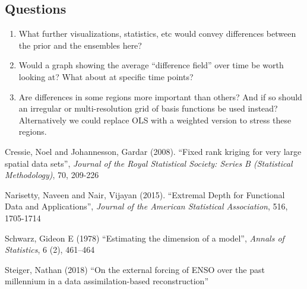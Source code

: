 \documentclass[12pt]{article}
\begin{document}
\subsection{Questions}
\begin{enumerate}
	\item What further visualizations, statistics, etc would convey differences between the prior and the ensembles here? 
	\item Would a graph showing the average ``difference field'' over time be worth looking at? What about at specific time points?
	\item Are differences in some regions more important than others? And if so should an irregular or multi-resolution grid of basis functions be used instead? Alternatively we could replace OLS with a weighted version to stress these regions.
\end{enumerate}

\begin{thebibliography}{999}

	Cressie, Noel and Johannesson, Gardar (2008).
	``Fixed rank kriging for very large spatial data sets'',
	\textit{Journal of the Royal Statistical Society: Series B (Statistical Methodology)},
	70, 209-226
	
	Narisetty, Naveen and Nair, Vijayan (2015).
	``Extremal Depth for Functional Data and Applications'',
	\textit{Journal of the American Statistical Association},
	516, 1705-1714
	
	Schwarz, Gideon E (1978)
	``Estimating the dimension of a model'',
	\textit{Annals of Statistics},
	6 (2), 461–464
	
	Steiger, Nathan (2018)
	``On the external forcing of ENSO over the past millennium in a data assimilation-based reconstruction''
\end{thebibliography}
\end{document}
